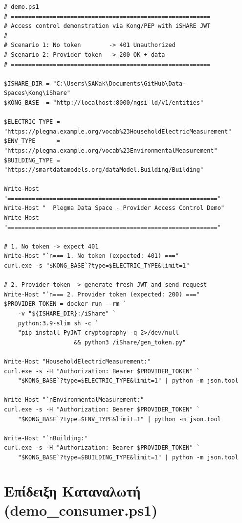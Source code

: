 \begin{lstlisting}[language={},]
# demo.ps1
# =========================================================
# Access control demonstration via Kong/PEP with iSHARE JWT
#
# Scenario 1: No token        -> 401 Unauthorized
# Scenario 2: Provider token  -> 200 OK + data
# =========================================================

$ISHARE_DIR = "C:\Users\SAKak\Documents\GitHub\Data-Spaces\Kong\iShare"
$KONG_BASE  = "http://localhost:8000/ngsi-ld/v1/entities"

$ELECTRIC_TYPE = "https://plegma.example.org/vocab%23HouseholdElectricMeasurement"
$ENV_TYPE      = "https://plegma.example.org/vocab%23EnvironmentalMeasurement"
$BUILDING_TYPE = "https://smartdatamodels.org/dataModel.Building/Building"

Write-Host "============================================================"
Write-Host "  Plegma Data Space - Provider Access Control Demo"
Write-Host "============================================================"

# 1. No token -> expect 401
Write-Host "`n=== 1. No token (expected: 401) ==="
curl.exe -s "$KONG_BASE`?type=$ELECTRIC_TYPE&limit=1"

# 2. Provider token -> generate fresh JWT and send request
Write-Host "`n=== 2. Provider token (expected: 200) ==="
$PROVIDER_TOKEN = docker run --rm `
    -v "${ISHARE_DIR}:/iShare" `
    python:3.9-slim sh -c `
    "pip install PyJWT cryptography -q 2>/dev/null 
                    && python3 /iShare/gen_token.py"

Write-Host "HouseholdElectricMeasurement:"
curl.exe -s -H "Authorization: Bearer $PROVIDER_TOKEN" `
    "$KONG_BASE`?type=$ELECTRIC_TYPE&limit=1" | python -m json.tool

Write-Host "`nEnvironmentalMeasurement:"
curl.exe -s -H "Authorization: Bearer $PROVIDER_TOKEN" `
    "$KONG_BASE`?type=$ENV_TYPE&limit=1" | python -m json.tool

Write-Host "`nBuilding:"
curl.exe -s -H "Authorization: Bearer $PROVIDER_TOKEN" `
    "$KONG_BASE`?type=$BUILDING_TYPE&limit=1" | python -m json.tool
\end{lstlisting}

\section{Επίδειξη Καταναλωτή (\textlatin{demo\_consumer.ps1})}
\label{app:demo-consumer}


